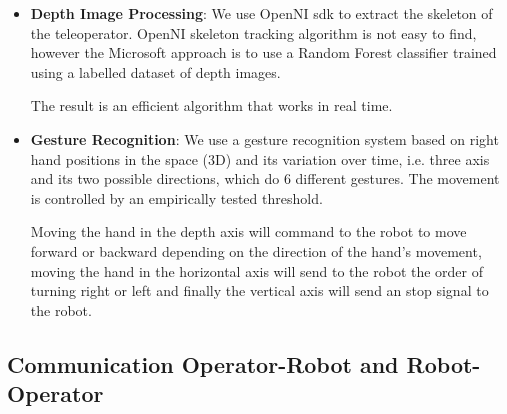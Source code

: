 \begin{itemize}
	\item \textbf{Depth Image Processing}: We use OpenNI sdk to extract the skeleton of the teleoperator. OpenNI skeleton tracking algorithm is not easy to find, however the Microsoft approach is to use a Random Forest classifier trained using a labelled dataset of depth images. 
	
	The result is an efficient algorithm that works in real time.
	
	\item \textbf{Gesture Recognition}: We use a gesture recognition system based on right hand positions in the space (3D) and its variation over time, i.e. three axis and its two possible directions, which do 6 different gestures. The movement is controlled by an empirically tested threshold.
		
	Moving the hand in the depth axis will command to the robot to move forward or backward depending on the direction of the hand's movement, moving the hand in the horizontal axis will send to the robot the order of turning right or left and finally the vertical axis will send an stop signal to the robot.
	
\end{itemize}

\subsection{Communication Operator-Robot and Robot-Operator}
